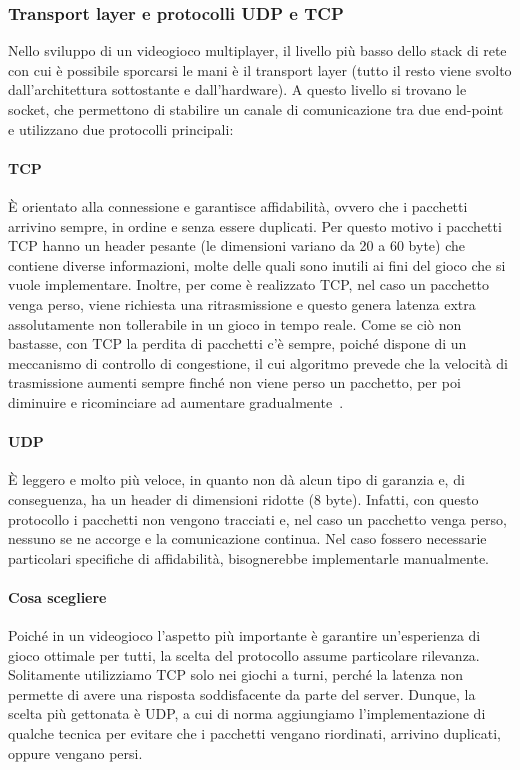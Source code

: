 \subsubsection{Transport layer e protocolli UDP e TCP}
Nello sviluppo di un videogioco multiplayer, il livello più basso dello stack di rete con cui è possibile sporcarsi le mani è il transport layer (tutto il resto viene svolto dall'architettura sottostante e dall'hardware). A questo livello si trovano le socket, che permettono di stabilire un canale di comunicazione tra due end-point e utilizzano due protocolli principali:

\paragraph{TCP}
È orientato alla connessione e garantisce affidabilità, ovvero che i pacchetti arrivino sempre, in ordine e senza essere duplicati. Per questo motivo i pacchetti TCP hanno un header pesante (le dimensioni variano da 20 a 60 byte) che contiene diverse informazioni, molte delle quali sono inutili ai fini del gioco che si vuole implementare. Inoltre, per come è realizzato TCP, nel caso un pacchetto venga perso, viene richiesta una ritrasmissione e questo genera latenza extra assolutamente non tollerabile in un gioco in tempo reale. Come se ciò non bastasse, con TCP la perdita di pacchetti c'è sempre, poiché dispone di un meccanismo di controllo di congestione, il cui algoritmo prevede che la velocità di trasmissione aumenti sempre finché non viene perso un pacchetto, per poi diminuire e ricominciare ad aumentare gradualmente~\cite{standard:rfc5681}.

\paragraph{UDP}
È leggero e molto più veloce, in quanto non dà alcun tipo di garanzia e, di conseguenza, ha un header di dimensioni ridotte (8 byte). Infatti, con questo protocollo i pacchetti non vengono tracciati e, nel caso un pacchetto venga perso, nessuno se ne accorge e la comunicazione continua. Nel caso fossero necessarie particolari specifiche di affidabilità, bisognerebbe implementarle manualmente.

\paragraph{Cosa scegliere}
Poiché in un videogioco l'aspetto più importante è garantire un'esperienza di gioco ottimale per tutti, la scelta del protocollo assume particolare rilevanza. Solitamente utilizziamo TCP solo nei giochi a turni, perché la latenza non permette di avere una risposta soddisfacente da parte del server. Dunque, la scelta più gettonata è UDP, a cui di norma aggiungiamo l'implementazione di qualche tecnica per evitare che i pacchetti vengano riordinati, arrivino duplicati, oppure vengano persi.

